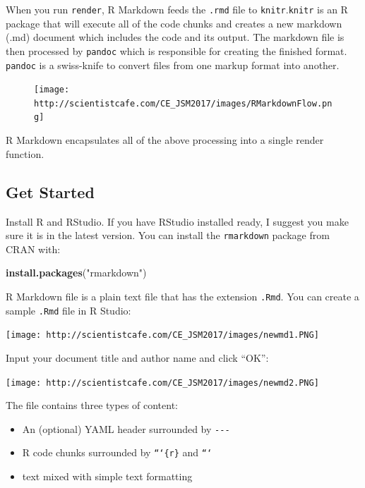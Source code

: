 \documentclass[]{book}
\newenvironment{Shaded}{\begin{snugshade}}{\end{snugshade}}
\newcommand{\KeywordTok}[1]{\textcolor[rgb]{0.13,0.29,0.53}{\textbf{{#1}}}}
\newcommand{\StringTok}[1]{\textcolor[rgb]{0.31,0.60,0.02}{{#1}}}
\newcommand{\NormalTok}[1]{{#1}}
\providecommand{\tightlist}{%
  \setlength{\itemsep}{0pt}\setlength{\parskip}{0pt}}
\theoremstyle{definition}
\theoremstyle{definition}
\theoremstyle{remark}
\begin{document}
When you run \texttt{render}, R Markdown feeds the \texttt{.rmd} file to
\texttt{knitr}.\texttt{knitr} is an R package that will execute all of
the code chunks and creates a new markdown (.md) document which includes
the code and its output. The markdown file is then processed by
\texttt{pandoc} which is responsible for creating the finished format.
\texttt{pandoc} is a swiss-knife to convert files from one markup format
into another.

\begin{figure}[htbp]
\centering
\texttt{[image: http://scientistcafe.com/CE\_JSM2017/images/RMarkdownFlow.png]}
\caption{}
\end{figure}

R Markdown encapsulates all of the above processing into a single render
function.

\subsection{Get Started}\label{get-started}

Install R and RStudio. If you have RStudio installed ready, I suggest
you make sure it is in the latest version. You can install the
\texttt{rmarkdown} package from CRAN with:

\begin{Shaded}
\begin{Highlighting}[]
\KeywordTok{install.packages}\NormalTok{(}\StringTok{"rmarkdown"}\NormalTok{)}
\end{Highlighting}
\end{Shaded}

R Markdown file is a plain text file that has the extension
\texttt{.Rmd}. You can create a sample \texttt{.Rmd} file in R Studio:

\texttt{[image: http://scientistcafe.com/CE\_JSM2017/images/newmd1.PNG]}

Input your document title and author name and click ``OK'':

\texttt{[image: http://scientistcafe.com/CE\_JSM2017/images/newmd2.PNG]}

The file contains three types of content:

\begin{itemize}
\tightlist
\item
  An (optional) YAML header surrounded by \texttt{-\/-\/-}
\item
  R code chunks surrounded by \texttt{```\{r\}} and \texttt{```}
\item
  text mixed with simple text formatting
\end{itemize}
\end{document}
